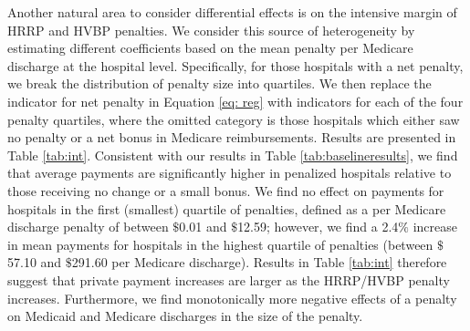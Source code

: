 \documentclass[12pt]{article}
\begin{document}
Another natural area to consider differential effects is on the intensive margin of HRRP and HVBP penalties. We consider this source of heterogeneity by estimating different coefficients based on the mean penalty per Medicare discharge at the hospital level. Specifically, for those hospitals with a net penalty, we break the distribution of penalty size into quartiles. We then replace the indicator for net penalty in Equation \ref{eq: reg} with indicators for each of the four penalty quartiles, where the omitted category is those hospitals which either saw no penalty or a net bonus in Medicare reimbursements. Results are presented in Table \ref{tab:int}.  Consistent with our results in Table \ref{tab:baselineresults}, we find that average payments are significantly higher in penalized hospitals relative to those receiving no change or a small bonus.  We find no effect on payments for hospitals in the first (smallest) quartile of penalties, defined as a per Medicare discharge penalty of between $\$$0.01 and $\$$12.59; however, we find a 2.4$\%$ increase in mean payments for hospitals in the highest quartile of penalties (between $\$$57.10 and $\$$291.60 per Medicare discharge).  Results in Table \ref{tab:int} therefore suggest that private payment increases are larger as the HRRP/HVBP penalty increases. Furthermore, we find monotonically more negative effects of a penalty on Medicaid and Medicare discharges in the size of the penalty. 
\end{document}
